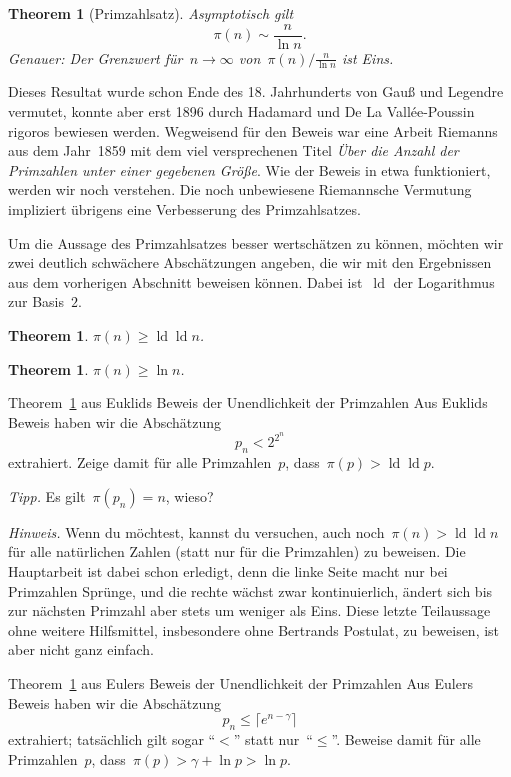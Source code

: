 \documentclass[twoside]{../zirkelblatt1415}
\theoremstyle{definition}
\theoremstyle{plain}
\newtheorem{thm}[defn]{Theorem}
\theoremstyle{remark}
\DeclareMathOperator{\ld}{ld}
\begin{document}
\begin{thm}[Primzahlsatz]
Asymptotisch gilt
\[ \pi(n) \sim \frac{n}{\ln n}. \]
Genauer: Der Grenzwert für~$n \to \infty$ von~$\pi(n) / \frac{n}{\ln n}$ ist
Eins.
\end{thm}

Dieses Resultat wurde schon Ende des 18. Jahrhunderts von Gauß und Legendre
vermutet, konnte aber erst 1896 durch Hadamard und De La Vallée-Poussin rigoros
bewiesen werden. Wegweisend für den Beweis war eine Arbeit Riemanns aus dem
Jahr~1859 mit dem viel versprechenen Titel \emph{Über die Anzahl der Primzahlen
unter einer gegebenen Größe}. Wie der Beweis in etwa funktioniert, werden wir
noch verstehen. Die noch unbewiesene Riemannsche Vermutung impliziert übrigens
eine Verbesserung des Primzahlsatzes.

Um die Aussage des Primzahlsatzes besser wertschätzen zu können, möchten wir
zwei deutlich schwächere Abschätzungen angeben, die wir mit den Ergebnissen aus
dem vorherigen Abschnitt beweisen können. Dabei ist~$\ld$ der Logarithmus zur
Basis~$2$.

\begin{thm}\label{thm:pi-schranke1}$\pi(n) \geq \ld \ld n$.\end{thm}
\begin{thm}\label{thm:pi-schranke2}$\pi(n) \geq \ln n$.\end{thm}

\begin{aufgabe}{Theorem~\ref{thm:pi-schranke1} aus Euklids Beweis der
Unendlichkeit der Primzahlen}
Aus Euklids Beweis haben wir die Abschätzung
\[ p_n < 2^{2^n} \]
extrahiert. Zeige damit für alle Primzahlen~$p$, dass~$\pi(p) > \ld \ld p$.

\emph{Tipp.} Es gilt~$\pi(p_n) = n$, wieso?

\emph{Hinweis.} Wenn du möchtest, kannst du versuchen, auch noch~$\pi(n) > \ld
\ld n$ für alle natürlichen Zahlen (statt nur für die Primzahlen) zu beweisen.
Die Hauptarbeit ist dabei schon erledigt, denn die linke Seite macht nur bei
Primzahlen Sprünge, und die rechte wächst zwar kontinuierlich, ändert sich bis
zur nächsten Primzahl aber stets um weniger als Eins. Diese letzte Teilaussage
ohne weitere Hilfsmittel, insbesondere ohne Bertrands Postulat, zu beweisen,
ist aber nicht ganz einfach.
\end{aufgabe}

\begin{aufgabe}{Theorem~\ref{thm:pi-schranke2} aus Eulers Beweis der
Unendlichkeit der Primzahlen}
Aus Eulers Beweis haben wir die Abschätzung
\[ p_n \leq \lceil e^{n-\gamma} \rceil \]
extrahiert; tatsächlich gilt sogar "`$<$"' statt nur~"`$\leq$"'. Beweise damit
für alle Primzahlen~$p$, dass~$\pi(p) > \gamma + \ln p > \ln p$.
\end{aufgabe}
\end{document}
